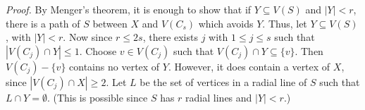 \textit{Proof.} By Menger's theorem, it is enough to show that if $Y \subseteq V(S)$ and $|Y| < r$, there is a path of $S$ between $X$ and $V(C_s)$ which avoids $Y$. Thus, let $Y \subseteq V(S)$, with $|Y| < r$. Now since $r \le 2s$, there exists $j$ with $1 \le j \le s$ such that $|V(C_j) \cap Y| \le 1$. Choose $v \in V(C_j)$ such that $V(C_j) \cap Y \subseteq \{v\}$. Then $V(C_j) - \{v\}$ contains no vertex of $Y$. However, it does contain a vertex of $X$, since $|V(C_j) \cap X| \ge 2$. Let $L$ be the set of vertices in a radial line of $S$ such that $L \cap Y = \emptyset$. (This is possible since $S$ has $r$ radial lines and $|Y| < r$.)
